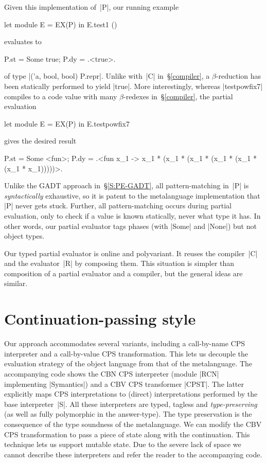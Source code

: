 Given this implementation of~|P|, our running example
\begin{code}
let module E = EX(P) in E.test1 ()
\end{code}
evaluates to
\begin{code}
{P.st = Some true; P.dy = .<true>.}
\end{code}
of type |('a, bool, bool) P.repr|.  Unlike with~|C| in~\S\ref{compiler},
a $\beta$-reduction has been statically performed to yield |true|.  More
interestingly, whereas |testpowfix7| compiles to a code value with many
$\beta$-redexes in~\S\ref{compiler}, the partial evaluation
\begin{code}
let module E = EX(P) in E.testpowfix7
\end{code}
gives the desired result
\begin{code}
{P.st = Some <fun>;
 P.dy = .<fun x_1 -> x_1 * (x_1 * (x_1 * (x_1 *
                    (x_1 * (x_1 * x_1)))))>.}
\end{code}

Unlike the GADT approach in~\S\ref{S:PE-GADT}, all pattern\hyp matching
in~|P| is \emph{syntactically} exhaustive, so it is patent to the metalanguage
implementation that |P| never gets stuck.  Further, all pattern\hyp matching occurs
during partial evaluation, only to check if a value is known statically,
never what type it has.  In other words, our partial evaluator tags
phases (with |Some| and |None|) but not object types.

Our typed partial evaluator is online and polyvariant.  It reuses the
compiler~|C| and the evaluator~|R| by composing them.  This situation is
simpler than  composition of a partial
evaluator and a compiler, but the general ideas are similar.

\section{Continuation\hyp passing style}\label{variations}
\label{state}
\label{S:CPS}

Our approach accommodates
several variants, including
a call-by-name CPS interpreter and a call-by-value CPS
transformation.
This lets us decouple the evaluation strategy of the object language
from that of the metalanguage. The accompanying code shows the CBN CPS
interpreter (module |RCN| implementing |Symantics|) and a CBV CPS
transformer |CPST|. The latter explicitly maps CPS interpretations to
(direct) interpretations performed by the base interpreter~|S|. All
these interpreters are typed, tagless and \emph{type-preserving} (as
well as fully polymorphic in the answer-type). The type preservation
is the consequence of the type soundness of the metalanguage.  We can
modify the CBV CPS transformation to pass a piece of state along with
the continuation. This technique lets us support mutable state.  Due
to the severe lack of space we cannot describe these interpreters and
refer the reader to the accompanying code.

